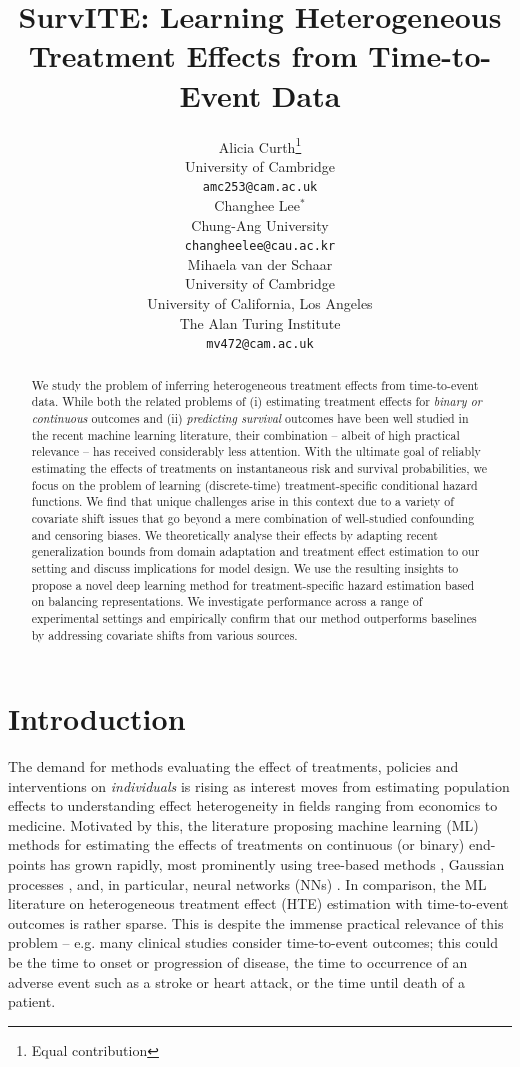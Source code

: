\documentclass{article}
\title{SurvITE: Learning Heterogeneous Treatment Effects from Time-to-Event Data}
\author{%
 Alicia Curth\thanks{Equal contribution} \\
  University of Cambridge\\
  \texttt{amc253@cam.ac.uk} \\
  \And
  Changhee Lee$^{*}$ \\
  Chung-Ang University \\
 \texttt{changheelee@cau.ac.kr} \\
  \And
    Mihaela van der Schaar \\
  University of Cambridge \\
  University of California, Los Angeles \\
  The Alan Turing Institute\\
  \texttt{mv472@cam.ac.uk}
}
\begin{document}
\maketitle
\begin{abstract} We study the problem of inferring heterogeneous treatment effects from time-to-event data. While both the related problems of (i) estimating treatment effects for \textit{binary or continuous} outcomes and (ii) \textit{predicting survival} outcomes have been well studied in the recent machine learning literature, their combination -- albeit of high practical relevance -- has received considerably less attention. With the ultimate goal of reliably estimating the effects of treatments on instantaneous risk and survival probabilities, we focus on the problem of learning (discrete-time) treatment-specific conditional hazard functions. We find that unique challenges arise in this context due to a variety of covariate shift issues that go beyond a mere combination of well-studied confounding and censoring biases. We theoretically analyse their effects by adapting recent generalization bounds from domain adaptation and treatment effect estimation to our setting and discuss implications for model design. We use the resulting insights to propose a novel deep learning method for treatment-specific hazard estimation based on balancing representations. We investigate performance across a range of experimental settings and empirically confirm that our method outperforms baselines by addressing covariate shifts from various sources.

\end{abstract}

\section{Introduction}
The demand for methods evaluating the effect of treatments, policies and interventions on \textit{individuals} is rising as interest moves from estimating population effects to understanding effect heterogeneity in fields ranging from economics to medicine. Motivated by this, the literature proposing machine learning (ML) methods for estimating the effects of treatments on continuous (or binary) end-points has grown rapidly, most prominently using tree-based methods \cite{hill2011bayesian, athey2016recursive, wager2018estimation, athey2019generalized, hahn2017bayesian}, Gaussian processes \cite{alaa2017bayesian, alaa2018limits}, and, in particular, neural networks (NNs) \cite{johansson2016learning, Shalit:16, johansson2018learning, shi2019adapting, hassanpour2019counterfactual, hassanpour2020learning, assaad2021counterfactual, curth2020}.  In comparison, the ML literature on heterogeneous treatment effect (HTE) estimation with time-to-event outcomes is rather sparse. This is despite the immense practical relevance of this problem -- e.g. many clinical studies consider time-to-event outcomes; this could be the time to onset or progression of disease, the time to occurrence of an adverse event such as a stroke or heart attack, or the time until death of a patient.
\end{document}
